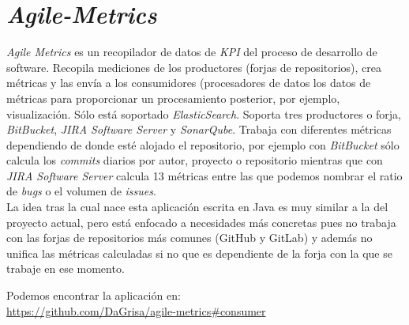 \section{\textit{Agile-Metrics}}
\textit{Agile Metrics} es un recopilador de datos de \textit{KPI} del proceso de desarrollo de software. Recopila mediciones de los productores (forjas de repositorios), crea métricas y las envía a los consumidores (procesadores de datos los datos de métricas para proporcionar un procesamiento posterior, por ejemplo, visualización. Sólo está soportado \textit{ElasticSearch}. Soporta tres productores o forja, \textit{BitBucket}, \textit{JIRA Software Server} y \textit{SonarQube}. Trabaja con diferentes métricas dependiendo de donde esté alojado el repositorio, por ejemplo con \textit{BitBucket} sólo calcula los \textit{commits} diarios por autor, proyecto o repositorio mientras que con \textit{JIRA Software Server} calcula 13 métricas entre las que podemos nombrar el ratio de \textit{bugs} o el volumen de \textit{issues}.\\

La idea tras la cual nace esta aplicación escrita en Java es muy similar a la del proyecto actual, pero está enfocado a necesidades más concretas pues no trabaja con las forjas de repositorios más comunes (GitHub y GitLab) y además no unifica las métricas calculadas si no que es dependiente de la forja con la que se trabaje en ese momento.

Podemos encontrar la aplicación en:\\
\url{https://github.com/DaGrisa/agile-metrics#consumer}



